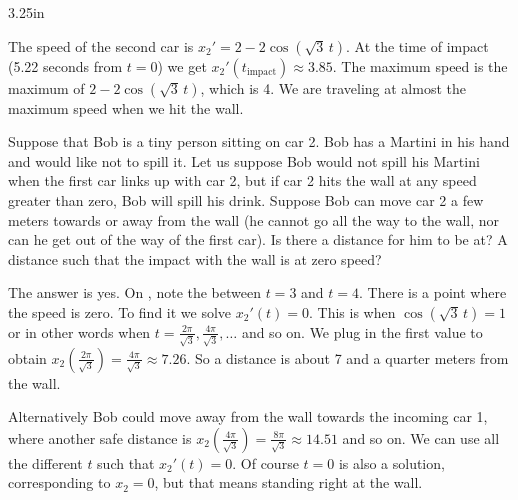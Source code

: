 \begin{example}
\begin{mywrapfig}{3.25in}
\capstart
{}
\caption{Position of the second car in time (ignoring the wall).\label{sosa:railcarfig}}
\end{mywrapfig}


The speed of the second car is $x_2' = 2 - 2 \cos ( \sqrt{3} \, t)$.
At the time of impact (5.22 seconds from $t=0$) we get 
$x_2'(t_{\text{impact}}) \approx 3.85$.
%
The maximum speed is the maximum of $2 - 2 \cos ( \sqrt{3} \, t )$, which is 4.
We are traveling at almost the maximum speed when we hit the wall.

\medskip

Suppose that Bob is a tiny person sitting on car 2.  Bob has a Martini in
his hand and would like not to spill it.  Let us suppose Bob would not spill
his Martini
when the first car links up with car 2, but if car 2 hits the wall at any
speed greater than zero, Bob will spill his drink.  Suppose Bob
can move car 2
a few meters towards or away from the wall (he cannot go all the way to the
wall, nor can he get out of the way of the first car).  Is there a
distance for him to be at?  A distance such that the impact with
the wall is at zero speed?

The answer is yes.  On ,
note the  between $t=3$ and $t=4$.  There is a point where
the speed is zero.  To find it we solve $x_2'(t) = 0$.  This is when
$\cos ( \sqrt{3} \, t) = 1$ or in other words when $t = \frac{2 \pi}{\sqrt{3}}, 
\frac{4 \pi}{\sqrt{3}},\ldots$ and so on.  We plug in the first value to obtain
$x_2\left(\frac{2 \pi}{\sqrt{3}}\right) = 
\frac{4 \pi}{\sqrt{3}} \approx 7.26$.  So a  distance is about 7 and a
quarter meters from the wall.

Alternatively Bob could move away from the wall
towards the incoming car 1, where another safe distance is
$x_2 \left( \frac{4 \pi}{\sqrt{3}} \right) = \frac{8 \pi}{\sqrt{3}}
\approx 14.51$ and so on.  We can use all the different
$t$ such that $x_2'(t) = 0$.  Of course $t=0$ is also a solution,
corresponding to $x_2 = 0$, but
that means standing right at the wall.
\end{example}

